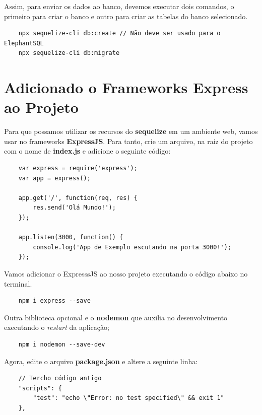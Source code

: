 Assim, para enviar os dados ao banco, devemos executar dois comandos, o primeiro para criar o banco e outro para criar as tabelas do banco selecionado.

\begin{verbatim}
	npx sequelize-cli db:create // Não deve ser usado para o ElephantSQL
	npx sequelize-cli db:migrate
\end{verbatim}

\section{Adicionado o Frameworks Express ao Projeto}

Para que possamos utilizar os recursos do \textbf{sequelize} em um ambiente web, vamos usar no frameworks \textbf{ExpressJS}. Para tanto, crie um arquivo, na raiz do projeto com o nome de \textbf{index.js} e adicione o seguinte código:

\begin{verbatim}
	var express = require('express');
	var app = express();
	
	app.get('/', function(req, res) {
		res.send('Olá Mundo!');
	});
	
	app.listen(3000, function() {
		console.log('App de Exemplo escutando na porta 3000!');
	});
\end{verbatim}

Vamos adicionar o ExpresssJS ao nosso projeto executando o código abaixo no terminal.

\begin{verbatim}
	npm i express --save
\end{verbatim}

Outra biblioteca opcional e o \textbf{nodemon} que auxilia no desenvolvimento executando o \textit{restart} da aplicação;

\begin{verbatim}
	npm i nodemon --save-dev 
\end{verbatim}

Agora, edite o arquivo \textbf{package.json} e altere a seguinte linha:

\begin{verbatim}
	// Tercho código antigo
	"scripts": {
		"test": "echo \"Error: no test specified\" && exit 1"
	},
\end{verbatim}


